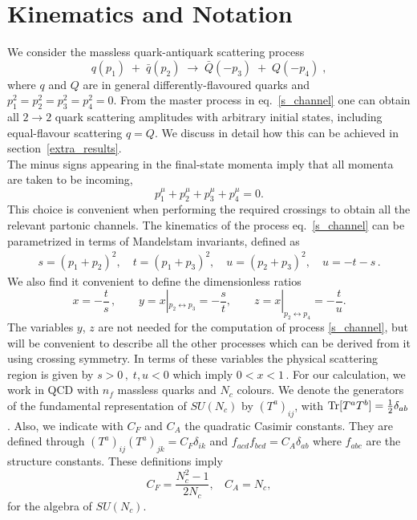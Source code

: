 
\section{Kinematics and Notation}\label{Kinematics}
We consider the massless quark-antiquark scattering process 
\begin{equation}
  { q}(p_1) \;+ \;\bar { q}(p_2)  \; \longrightarrow \;  { \bar Q}(-p_3) \;+ \; {   Q}(-p_4) \; ,    \label{s_channel} 
\end{equation}
where $q$ and $Q$ are in general differently-flavoured quarks
and $p_1^2=p_2^2=p_3^2=p_4^2=0$. From
the master process in eq.~\eqref{s_channel} one can obtain all $2 \to
2$ quark scattering amplitudes with arbitrary initial states, including equal-flavour scattering
$q=Q$.  We discuss in detail how this can be achieved in section~\ref{extra_results}.\\ The minus signs appearing in the final-state
momenta imply that all momenta are taken to be incoming,
\begin{equation}
p_1^\mu + p_2^\mu  + p_3^\mu + p_4^\mu = 0.
\end{equation}
This choice is convenient when performing the required crossings to obtain
all the relevant partonic channels.
The kinematics of the process eq.~\eqref{s_channel} can be parametrized in
terms of Mandelstam invariants, defined as
\begin{align}
s%
 = (p_1 + p_2)^2, \quad
t %
 = (p_1 + p_3)^2, \quad
u %
 = (p_2 + p_3)^2,
\quad u = -t-s \,.
\end{align}
We also find it convenient to define the dimensionless ratios 
\begin{equation}\label{variables}
x=-\frac{t}{s}\,, 
\quad\quad y = x|_{p_2 \leftrightarrow p_3} = -\frac{s}{t} , \quad\quad z = x|_{p_2 \leftrightarrow p_4} = -\frac{t}{u}.
\end{equation}
The variables $y$, $z$ are not needed for the computation of process
\eqref{s_channel}, but will be convenient to describe all the other
processes which can be derived from it using crossing symmetry.  In
terms of these variables the physical scattering region is given by $s >
0\,, \; t,u < 0$ which imply $0 < x < 1\,.$
For our calculation, we work in QCD with $n_f$ massless quarks and 
$N_c$ colours. We denote the
generators of the fundamental representation of $SU(N_c)$ 
by $(T^a)_{ij}$, with $\operatorname{Tr}[T^aT^b] =
\frac12 \delta_{ab}$. 
Also, we indicate with $C_F$ and $C_A$ the quadratic Casimir constants.
They are defined through
$({T^a})_{ij} ({T^a})_{jk} =
C_F \delta_{ik}$
and 
$f_{acd}f_{bcd} = C_A\delta_{ab}$
where $f_{abc}$ are the 
structure constants.
These definitions imply
\begin{equation}
  C_F=\frac{N_c^2-1}{2N_c},~~~~ C_A = N_c,
\end{equation}
for the algebra of $SU(N_c)$.

